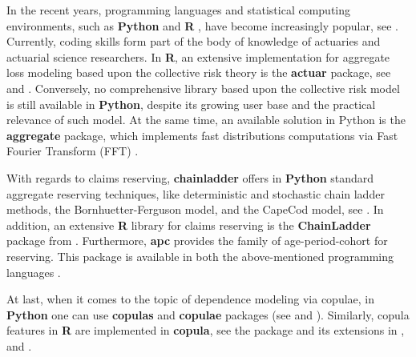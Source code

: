 \documentclass{article}
\begin{document}
In the recent years, programming languages and statistical computing environments, such as \textbf{Python} \cite{python} and \textbf{R} \cite{R}, have become increasingly popular, see \cite{ozgur22}. Currently, coding skills form part of the body of knowledge of actuaries and actuarial science researchers.
In \textbf{R}, an extensive implementation for aggregate loss modeling based upon the collective risk theory is the \textbf{actuar} package, see \cite{actuar1} and \cite{actuar2}.
Conversely, no comprehensive library based upon the collective risk model is still available in \textbf{Python}, despite its growing user base and the practical relevance of such model.
At the same time, an available solution in Python is the \textbf{aggregate} package, which implements fast distributions computations via Fast Fourier Transform (FFT) \cite{aggregatepackage}.

With regards to claims reserving, \textbf{chainladder} offers in \textbf{Python} standard aggregate reserving techniques, like deterministic and stochastic chain ladder methods, the Bornhuetter-Ferguson model, and the CapeCod model, see \cite{chainladderPypackage}. In addition, an extensive \textbf{R} library for claims reserving is the \textbf{ChainLadder} package from \cite{chainladderR}. Furthermore, \textbf{apc} provides the family of age-period-cohort for reserving. This package is available in both the above-mentioned programming languages \cite{apcpackage}. 

At last, when it comes to the topic of dependence modeling via copulae, in \textbf{Python} one can use \textbf{copulas} and \textbf{copulae} packages (see \cite{copulaepackage} and \cite{copulaspackage}). Similarly, copula features in \textbf{R} are implemented in \textbf{copula}, see the package and its extensions in \cite{copulaR1}, \cite{copulaR2} and \cite{copulaR3}. 
\end{document}
